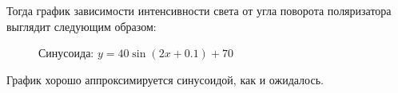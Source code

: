     Тогда график зависимости интенсивности света от угла поворота поляризатора выглядит следующим образом:
    \begin{figure}[h!]
        \noindent{}
        \caption{Синусоида: $y = 40 \sin{(2x + 0.1)} + 70$}
    \end{figure}
    \newpage
    График хорошо аппроксимируется синусоидой, как и ожидалось.